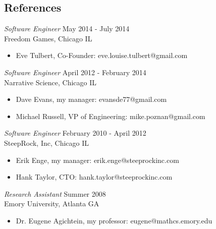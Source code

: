 \documentclass[line,margin]{res}
\begin{document}
\address{waltaskew@gmail.com}
\address{404-819-9796}

\begin{resume}
 
\section{References}
        {\sl Software Engineer} \hfill May 2014 - July 2014 \\
        Freedom Games, Chicago IL
        \begin{itemize}
          \item Eve Tulbert, Co-Founder: eve.louise.tulbert@gmail.com
        \end{itemize}
        {\sl Software Engineer} \hfill April 2012 - February 2014 \\
        Narrative Science, Chicago IL
        \begin{itemize} 
          \item Dave Evans, my manager: evansde77@gmail.com
          \item Michael Russell, VP of Engineering: mike.poznan@gmail.com
        \end{itemize}

        {\sl Software Engineer} \hfill February 2010 - April 2012 \\
        SteepRock, Inc, Chicago IL
        \begin{itemize}
          \item Erik Enge, my manager: erik.enge@steeprockinc.com
          \item Hank Taylor, CTO: hank.taylor@steeprockinc.com
        \end{itemize}

        {\sl Research Assistant} \hfill Summer 2008 \\
        Emory University, Atlanta GA
        \begin{itemize}
          \item Dr. Eugene Agichtein, my professor: eugene@mathcs.emory.edu
        \end{itemize}

\end{resume}
\end{document}
